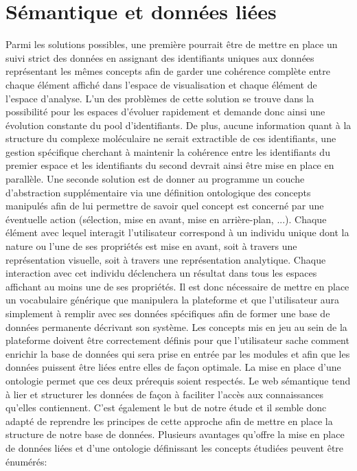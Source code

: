 \section{Sémantique et données liées}

Parmi les solutions possibles, une première pourrait être de mettre en place un suivi strict des données en assignant des identifiants uniques aux données représentant les mêmes concepts afin de garder une cohérence complète entre chaque élément affiché dans l'espace de visualisation et chaque élément de l'espace d'analyse. L'un des problèmes de cette solution se trouve dans la possibilité pour les espaces d'évoluer rapidement et demande donc ainsi une évolution constante du pool d'identifiants. De plus, aucune information quant à la structure du complexe moléculaire ne serait extractible de ces identifiants, une gestion spécifique cherchant à maintenir la cohérence entre les identifiants du premier espace et les identifiants du second devrait ainsi être mise en place en parallèle.
Une seconde solution est de donner au programme un couche d'abstraction supplémentaire via une définition ontologique des concepts manipulés afin de lui permettre de savoir quel concept est concerné par une éventuelle action (sélection, mise en avant, mise en arrière-plan, ...). Chaque élément avec lequel interagit l'utilisateur correspond à un individu unique dont la nature ou l'une de ses propriétés est mise en avant, soit à travers une représentation visuelle, soit à travers une représentation analytique. Chaque interaction avec cet individu déclenchera un résultat dans tous les espaces affichant au moins une de ses propriétés.
Il est donc nécessaire de mettre en place un vocabulaire générique que manipulera la plateforme et que l'utilisateur aura simplement à remplir avec ses données spécifiques afin de former une base de données permanente décrivant son système. 
Les concepts mis en jeu au sein de la plateforme doivent être correctement définis pour que l'utilisateur sache comment enrichir la base de données qui sera prise en entrée par les modules et afin que les données puissent être liées entre elles de façon optimale. La mise en place d'une ontologie permet que ces deux prérequis soient respectés. Le web sémantique tend à lier et structurer les données de façon à faciliter l'accès aux connaissances qu'elles contiennent. C'est également le but de notre étude et il semble donc adapté de reprendre les principes de cette approche afin de mettre en place la structure de notre base de données. Plusieurs avantages qu'offre la mise en place de données liées et d'une ontologie définissant les concepts étudiées peuvent être énumérés:

